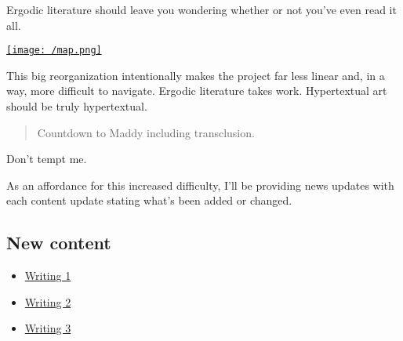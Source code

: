 Ergodic literature should leave you wondering whether or not you've even read it all.

\href{/map}{\texttt{[image: /map.png]}}

This big reorganization intentionally makes the project far less linear and, in a way, more difficult to navigate. Ergodic literature takes work. Hypertextual art should be truly hypertextual.

\begin{quote}
Countdown to Maddy including transclusion.
\end{quote}

Don't tempt me.

As an affordance for this increased difficulty, I'll be providing news updates with each content update stating what's been added or changed.

\hypertarget{new-content}{%
\subsection{New content}\label{new-content}}

\begin{itemize}
\tightlist
\item
  \href{/writing}{Writing 1}
\item
  \href{/writing/2}{Writing 2}
\item
  \href{/writing/3}{Writing 3}
\end{itemize}
